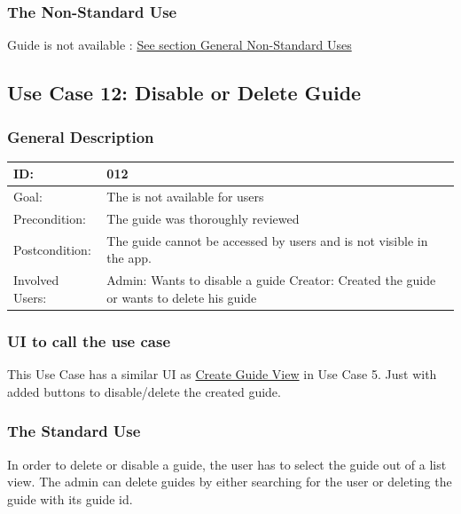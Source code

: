 \documentclass[12pt]{article}
\theoremstyle{definition}
\newenvironment{text}{
   \setlength{\parindent}{0pt}
   \color{black}
}{}
\begin{document}
    \subsubsection{The Non-Standard Use}
    \begin{text}
    Guide is not available : \hyperref[sec:gnsu]{See section General Non-Standard Uses }
    \end{text}

\subsection{Use Case 12: Disable or Delete Guide}
    \subsubsection{General Description}
    \begin{tabular}{|p{.2\linewidth}|p{.65\linewidth}|}
    \hline 
    ID: & 012 \\ \hline
    Goal: & The is not available for users  \\ \hline
    Precondition: & The guide was thoroughly reviewed\\ \hline
    Postcondition: & The guide cannot be accessed by users and is not visible in the app. \\ \hline
    Involved Users: & Admin: Wants to disable a guide \newline
Creator: Created the guide or wants to delete his guide \\ \hline
    \end{tabular}
    \newline
    
    \newpage
    \subsubsection{UI to call the use case}
    \begin{text}
    This Use Case has a similar UI as \hyperref[fig:create_guide]{Create Guide View} in Use Case 5. Just with added buttons to disable/delete the created guide.
    \end{text}
    
    \subsubsection{The Standard Use}
    
    \begin{text}
    In order to delete or disable a guide, the user has to select the guide out of a list view. The admin can delete guides by either searching for the user or deleting the guide with its guide id.
    \end{text}
    
\end{document}
